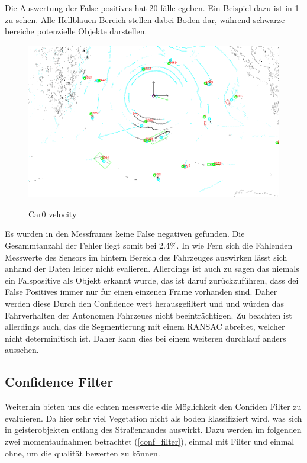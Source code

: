 \documentclass[11pt,oneside,openright]{mpreport}
\begin{document}
Die Auswertung der False positives hat 20 fälle egeben. Ein Beispiel dazu ist in \cref{false_pos_seg_1} zu sehen. Alle Hellblauen Bereich stellen
dabei Boden dar, während schwarze bereiche potenzielle Objekte darstellen.

\begin{figure}[!htb]
  \caption{Car0 velocity} 
  \centering
  \includegraphics[width=\textwidth]{bilder/false_pos1.png}
 \label{false_pos_seg_1}
\end{figure}


Es wurden in den Messframes keine False negativen gefunden. Die Gesammtanzahl der Fehler liegt somit bei 2.4\%. 
In wie Fern sich die Fahlenden Messwerte des Sensors im hintern Bereich des Fahrzeuges auswirken lässt sich anhand der Daten leider nicht
evalieren. Allerdings ist auch zu sagen das niemals ein Falspositive als Objekt erkannt wurde, das ist daruf zurückzuführen,
dass dei False Positives immer nur für einen einzenen Frame vorhanden sind. Daher werden diese Durch den Confidence wert herausgefiltert und
und würden das Fahrverhalten der Autonomen Fahrzeues nicht beeinträchtigen. Zu beachten ist allerdings auch, das die Segmentierung mit einem
\ac{RANSAC} abreitet, welcher nicht determinitisch ist. Daher kann dies bei einem weiteren durchlauf anders aussehen.

\subsection{Confidence Filter}
Weiterhin bieten uns die echten messwerte die Möglichkeit den Confiden Filter zu evaluieren. 
Da hier sehr viel Vegetation nicht als boden klassifiziert wird, was sich in geisterobjekten entlang des Straßenrandes auswirkt.
Dazu werden im folgenden zwei momentaufnahmen betrachtet (\cref{conf_filter}), einmal mit Filter und einmal ohne, um die qualität bewerten zu können.
\end{document}
